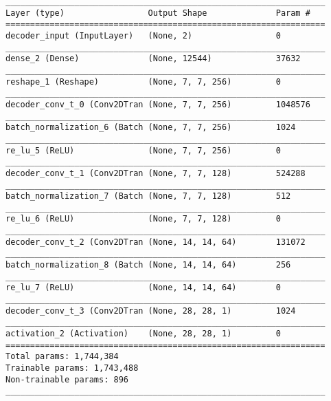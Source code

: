 \begin{lstlisting}[caption={\textsc{Mnist}-VAE-GAN Decoder},captionpos=b,basicstyle=\tiny, label={lst:mnist-vae-decoder}]
_________________________________________________________________
Layer (type)                 Output Shape              Param #
=================================================================
decoder_input (InputLayer)   (None, 2)                 0
_________________________________________________________________
dense_2 (Dense)              (None, 12544)             37632
_________________________________________________________________
reshape_1 (Reshape)          (None, 7, 7, 256)         0
_________________________________________________________________
decoder_conv_t_0 (Conv2DTran (None, 7, 7, 256)         1048576
_________________________________________________________________
batch_normalization_6 (Batch (None, 7, 7, 256)         1024
_________________________________________________________________
re_lu_5 (ReLU)               (None, 7, 7, 256)         0
_________________________________________________________________
decoder_conv_t_1 (Conv2DTran (None, 7, 7, 128)         524288
_________________________________________________________________
batch_normalization_7 (Batch (None, 7, 7, 128)         512
_________________________________________________________________
re_lu_6 (ReLU)               (None, 7, 7, 128)         0
_________________________________________________________________
decoder_conv_t_2 (Conv2DTran (None, 14, 14, 64)        131072
_________________________________________________________________
batch_normalization_8 (Batch (None, 14, 14, 64)        256
_________________________________________________________________
re_lu_7 (ReLU)               (None, 14, 14, 64)        0
_________________________________________________________________
decoder_conv_t_3 (Conv2DTran (None, 28, 28, 1)         1024
_________________________________________________________________
activation_2 (Activation)    (None, 28, 28, 1)         0
=================================================================
Total params: 1,744,384
Trainable params: 1,743,488
Non-trainable params: 896
_________________________________________________________________
\end{lstlisting}